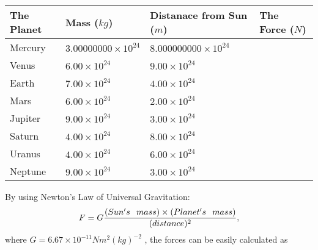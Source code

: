 \documentclass[12pt]{article}
\begin{document}
\vspace{0.2in}
 
 
\begin{tabular}{|l|l|l|l|}
\hline
The Planet & Mass ($kg$) & Distanace from Sun ($m$) & The Force ($N$)\\
\hline
Mercury  &
           $ %
3.00000000 \times 10^{24} $   &
             $ %
8.000000000 \times 10^{24} $    &
\\  \hline
Venus    &
           $ %
6.00 \times 10^{24} $    &
             $ %
9.00 \times 10^{24} $    &
\\  \hline
Earth    &
           $ %
7.00 \times 10^{24} $    &
             $ %
4.00 \times 10^{24} $    &
\\   \hline
Mars     &
           $ %
6.00 \times 10^{24} $    &
             $ %
2.00 \times 10^{24} $    &
\\   \hline
Jupiter  &
           $ %
9.00 \times 10^{24} $    &
             $ %
3.00 \times 10^{24} $    &
\\  \hline
Saturn   &
           $ %
4.00 \times 10^{24}$    &
             $ %
8.00 \times 10^{24}$    &
\\  \hline
Uranus   &
           $ %
4.00 \times 10^{24} $    &
             $ %
6.00 \times 10^{24} $    &
\\  \hline
Neptune  &
           $ %
9.00 \times 10^{24} $    &
             $ %
3.00 \times 10^{24} $    &
\\  \hline
 
\end{tabular}
 
 
 
 
\noindent{}
 
 

By using Newton's Law of Universal Gravitation:
\[
F=G \frac{(Sun's \hspace{0.1in} mass) \times (Planet's \hspace{0.1in} mass)} { (distance)^2},
\]
where
$ G= %
6.67 \times 10^{-11}N m^{2}(kg)^{-2}$ , the forces can be easily calculated as
 
\vspace{0.2in}
 
\end{document}
